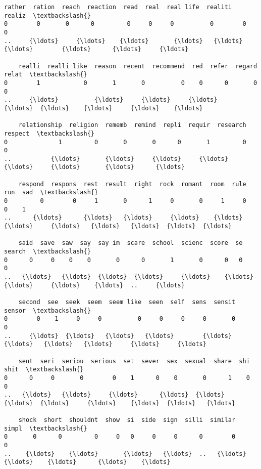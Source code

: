 \documentclass[11pt]{article}
\begin{document}
\begin{Verbatim}[commandchars=\\\{\}]
    rather  ration  reach  reaction  read  real  real life  realiti  realiz  \textbackslash{}
0        0       0      0         0     0     0          0        0       0   
..     {\ldots}     {\ldots}    {\ldots}       {\ldots}   {\ldots}   {\ldots}        {\ldots}      {\ldots}     {\ldots}   

    realli  realli like  reason  recent  recommend  red  refer  regard  relat  \textbackslash{}
0        1            0       1       0          0    0      0       0      0   
..     {\ldots}          {\ldots}     {\ldots}     {\ldots}        {\ldots}  {\ldots}    {\ldots}     {\ldots}    {\ldots}   

    relationship  religion  rememb  remind  repli  requir  research  respect  \textbackslash{}
0              1         0       0       0      0       1         0        0   
..           {\ldots}       {\ldots}     {\ldots}     {\ldots}    {\ldots}     {\ldots}       {\ldots}      {\ldots}   

    respond  respons  rest  result  right  rock  romant  room  rule  run  sad  \textbackslash{}
0         0        0     1       0      1     0       0     1     0    0    1   
..      {\ldots}      {\ldots}   {\ldots}     {\ldots}    {\ldots}   {\ldots}     {\ldots}   {\ldots}   {\ldots}  {\ldots}  {\ldots}   

    said  save  saw  say  say im  scare  school  scienc  score  se  search  \textbackslash{}
0      0     0    0    0       0      0       1       0      0   0       0   
..   {\ldots}   {\ldots}  {\ldots}  {\ldots}     {\ldots}    {\ldots}     {\ldots}     {\ldots}    {\ldots}  ..     {\ldots}   

    second  see  seek  seem  seem like  seen  self  sens  sensit  sensor  \textbackslash{}
0        0    1     0     0          0     0     0     0       0       0   
..     {\ldots}  {\ldots}   {\ldots}   {\ldots}        {\ldots}   {\ldots}   {\ldots}   {\ldots}     {\ldots}     {\ldots}   

    sent  seri  seriou  serious  set  sever  sex  sexual  share  shi  shit  \textbackslash{}
0      0     0       0        0    1      0    0       0      1    0     0   
..   {\ldots}   {\ldots}     {\ldots}      {\ldots}  {\ldots}    {\ldots}  {\ldots}     {\ldots}    {\ldots}  {\ldots}   {\ldots}   

    shock  short  shouldnt  show  si  side  sign  silli  similar  simpl  \textbackslash{}
0       0      0         0     0   0     0     0      0        0      0   
..    {\ldots}    {\ldots}       {\ldots}   {\ldots}  ..   {\ldots}   {\ldots}    {\ldots}      {\ldots}    {\ldots}   


\end{Verbatim}
\end{document}
